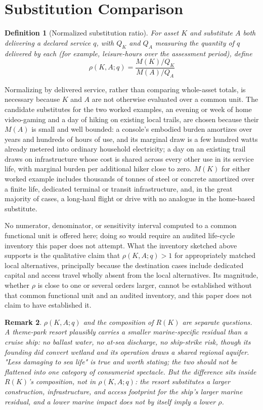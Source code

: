 \documentclass[11pt]{article}
\newtheorem{definition}{Definition}[section]
\newtheorem{remark}[definition]{Remark}
\begin{document}
\section{Substitution Comparison}

\begin{definition}[Normalized substitution ratio]
For asset $K$ and substitute $A$ both delivering a declared service $q$, with $Q_K$ and $Q_A$ measuring the quantity of $q$ delivered by each (for example, leisure-hours over the assessment period), define
\[
\rho(K,A;q) = \frac{M(K)/Q_K}{M(A)/Q_A}
\]
\end{definition}

Normalizing by delivered service, rather than comparing whole-asset totals, is necessary because $K$ and $A$ are not otherwise evaluated over a common unit. The candidate substitutes for the two worked examples, an evening or week of home video-gaming and a day of hiking on existing local trails, are chosen because their $M(A)$ is small and well bounded: a console's embodied burden amortizes over years and hundreds of hours of use, and its marginal draw is a few hundred watts already metered into ordinary household electricity; a day on an existing trail draws on infrastructure whose cost is shared across every other use in its service life, with marginal burden per additional hiker close to zero. $M(K)$ for either worked example includes thousands of tonnes of steel or concrete amortized over a finite life, dedicated terminal or transit infrastructure, and, in the great majority of cases, a long-haul flight or drive with no analogue in the home-based substitute.

No numerator, denominator, or sensitivity interval computed to a common functional unit is offered here; doing so would require an audited life-cycle inventory this paper does not attempt. What the inventory sketched above supports is the qualitative claim that $\rho(K,A;q) > 1$ for appropriately matched local alternatives, principally because the destination cases include dedicated capital and access travel wholly absent from the local alternatives. Its magnitude, whether $\rho$ is close to one or several orders larger, cannot be established without that common functional unit and an audited inventory, and this paper does not claim to have established it.

\begin{remark}
$\rho(K,A;q)$ and the composition of $R(K)$ are separate questions. A theme-park resort plausibly carries a smaller marine-specific residual than a cruise ship: no ballast water, no at-sea discharge, no ship-strike risk, though its founding did convert wetland and its operation draws a shared regional aquifer. "Less damaging to sea life" is true and worth stating; the two should not be flattened into one category of consumerist spectacle. But the difference sits inside $R(K)$'s composition, not in $\rho(K,A;q)$: the resort substitutes a larger construction, infrastructure, and access footprint for the ship's larger marine residual, and a lower marine impact does not by itself imply a lower $\rho$.
\end{remark}
\end{document}
